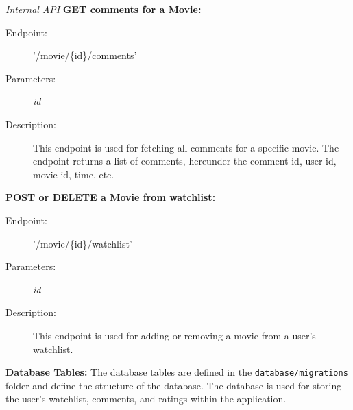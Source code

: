 \textit{Internal API}
\textbf{\newline GET comments for a Movie:}
\begin{description}
    \item [Endpoint:] '/movie/\{id\}/comments'
    \item [Parameters:] \textit{id}
    \item [Description:] This endpoint is used for fetching all comments for a specific movie. The endpoint returns a list of comments, hereunder the comment id, user id, movie id, time, etc.
\end{description}
\textbf{POST or DELETE a Movie from watchlist:}
\begin{description}
    \item [Endpoint:] '/movie/\{id\}/watchlist'
    \item [Parameters:] \textit{id}
    \item [Description:] This endpoint is used for adding or removing a movie from a user's watchlist.
\end{description}


\textbf{Database Tables:}
The database tables are defined in the \texttt{database/migrations} folder and define the structure of the database. The database is used for storing the user's watchlist, comments, and ratings within the application.

